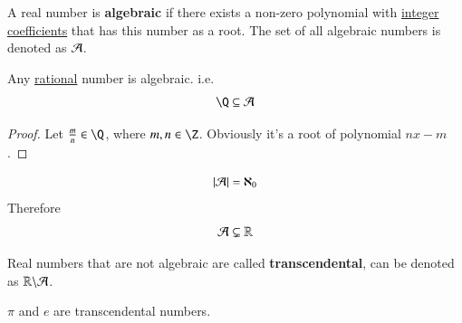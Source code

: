 \documentclass[10pt]{article}
\begin{document}
		\begin{definition}
			A real number is \textbf{algebraic} if there exists a non-zero polynomial with \ul{integer coefficients} that has this number as a root. The set of all algebraic numbers is denoted as $\mathcal{{A}}$.
		\end{definition}
		
		\begin{theorem}
			Any \ul{rational} number is algebraic. i.e. 
			\[
				\Q \subseteq \mc{A}
			\]
		\end{theorem}
		\begin{proof}
			Let $\frac{m}{n} \in \Q$, where $m, n \in \Z$.
			Obviously it's a root of polynomial $nx - m$.
		\end{proof}
		
		\begin{theorem}
			\[
				|\mathcal{{A}}| = \aleph_0
			\]
			Therefore 
			\[
				\mathcal{{A}} \subsetneq \mathbb{R}
			\]
		\end{theorem}
		
		\begin{definition}
			Real numbers that are not algebraic are called \textbf{transcendental}, can be denoted as $\mathbb{R} \backslash \mathcal{{A}}$.
		\end{definition}
		
		\begin{example}
			$\pi$ and $e$ are transcendental numbers.
		\end{example}
\end{document}
